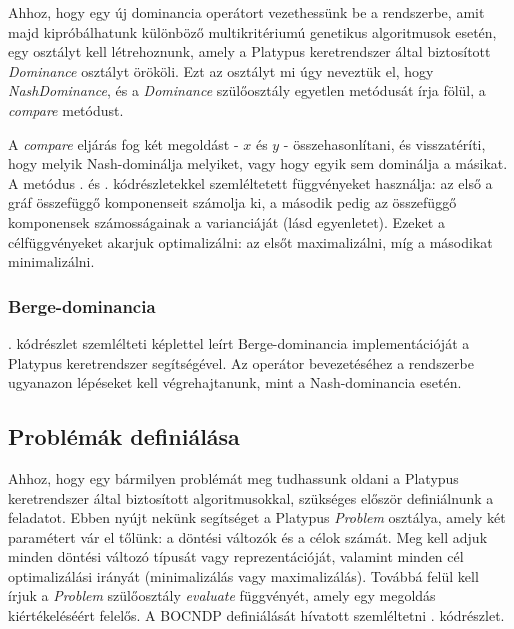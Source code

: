 

Ahhoz, hogy egy új dominancia operátort vezethessünk be a rendszerbe, amit majd kipróbálhatunk különböző multikritériumú genetikus algoritmusok esetén,
egy osztályt kell létrehoznunk, amely a Platypus keretrendszer által biztosított \emph{Dominance} osztályt örököli.
Ezt az osztályt mi úgy neveztük el, hogy \emph{NashDominance}, és a \emph{Dominance} szülőosztály egyetlen metódusát írja fölül, a \emph{compare} metódust.

A \emph{compare} eljárás fog két megoldást - $x$ és $y$ - összehasonlítani, és visszatéríti, hogy melyik Nash-dominálja melyiket, vagy hogy egyik sem dominálja a másikat.
A metódus . és . kódrészletekkel szemléltetett függvényeket használja:
az első a gráf összefüggő komponenseit számolja ki, a második pedig az összefüggő komponensek számosságainak a varianciáját (lásd  egyenletet).
Ezeket a célfüggvényeket akarjuk optimalizálni: az elsőt maximalizálni, míg a másodikat minimalizálni.


\subsubsection{Berge-dominancia}
. kódrészlet szemlélteti  képlettel leírt Berge-dominancia implementációját a Platypus keretrendszer segítségével.
Az operátor bevezetéséhez a rendszerbe ugyanazon lépéseket kell végrehajtanunk, mint a Nash-dominancia esetén.




\subsection{Problémák definiálása}
Ahhoz, hogy egy bármilyen problémát meg tudhassunk oldani a Platypus keretrendszer által biztosított algoritmusokkal, szükséges először definiálnunk a feladatot.
Ebben nyújt nekünk segítséget a Platypus \emph{Problem} osztálya, amely két paramétert vár el tőlünk: a döntési változók és a célok számát.
Meg kell adjuk minden döntési változó típusát vagy reprezentációját, valamint minden cél optimalizálási irányát (minimalizálás vagy maximalizálás).
Továbbá felül kell írjuk a \emph{Problem} szülőosztály \emph{evaluate} függvényét, amely egy megoldás kiértékeléséért felelős.
A BOCNDP definiálását hívatott szemléltetni . kódrészlet.

